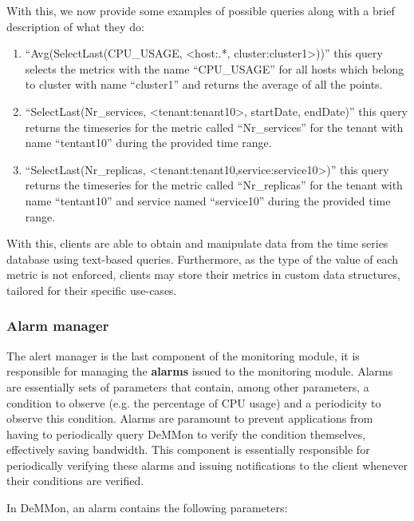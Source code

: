  With this, we now provide some examples of possible queries along with a brief description of what they do:

\begin{enumerate}
    \item ``Avg(SelectLast(CPU\_USAGE, <host:.*, cluster:cluster1>))'' this query selects the metrics with the name ``CPU\_USAGE'' for all hosts which belong to cluster with name ``cluster1'' and returns the average of all the points.
    
    \item ``SelectLast(Nr\_services, <tenant:tenant10>, startDate, endDate)'' this query returns the timeseries for the metric called ``Nr\_services'' for the tenant with name ``tentant10'' during the provided time range.

    \item ``SelectLast(Nr\_replicas, <tenant:tenant10,service:service10>)'' this query returns the timeseries for the metric called ``Nr\_replicas'' for the tenant with name ``tentant10'' and service named ``service10'' during the provided time range.
    
\end{enumerate}

With this, clients are able to obtain and manipulate data from the time series database using text-based queries. Furthermore, as the type of the value of each metric is not enforced, clients may store their metrics in custom data structures, tailored for their specific use-cases.

\subsubsection{Alarm manager} \label{sec:mon_module:alarm_monitor}

The alert manager is the last component of the monitoring module, it is responsible for managing the \textbf{alarms} issued to the monitoring module. Alarms are essentially sets of parameters that contain, among other parameters, a condition to observe (e.g. the percentage of CPU usage) and a periodicity to observe this condition. Alarms are paramount to prevent applications from having to periodically query DeMMon to verify the condition themselves, effectively saving bandwidth. This component is essentially responsible for periodically verifying these alarms and issuing notifications to the client whenever their conditions are verified. 

In DeMMon, an alarm contains the following parameters: 

